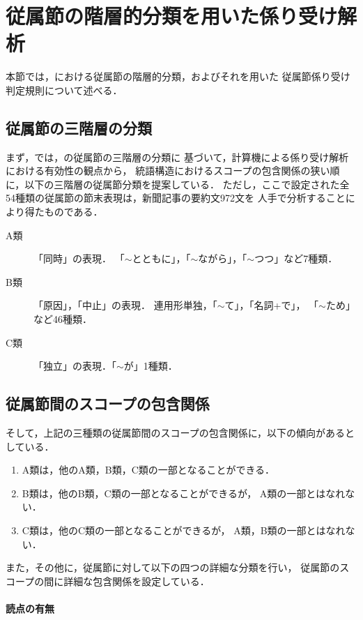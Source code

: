 \section{従属節の階層的分類を用いた係り受け解析}
\label{sec:sbrd_hd}

本節では，\cite{SShirai95bj}における従属節の階層的分類，およびそれを用いた
従属節係り受け判定規則について述べる．

\subsection{従属節の三階層の分類}
\label{subsec:clsb}

まず，\cite{SShirai95bj}では，\cite{Minami73aj,Minami93aj}の従属節の三階層の分類に
基づいて，計算機による係り受け解析における有効性の観点から，
統語構造におけるスコープの包含関係の狭い順に，以下の三階層の従属節分類を提案している．
ただし，ここで設定された全54種類の従属節の節末表現は，新聞記事の要約文972文を
人手で分析することにより得たものである．
\begin{description}
  \item[A類] 「同時」の表現．
        「$\sim$とともに」，「$\sim$ながら」，「$\sim$つつ」など7種類．
  \item[B類] 「原因」，「中止」の表現．
        連用形単独，「$\sim$て」，「名詞+で」，
        「$\sim$ため」など46種類．
  \item[C類] 「独立」の表現．「$\sim$が」1種類．
\end{description}

\subsection{従属節間のスコープの包含関係}

そして，上記の三種類の従属節間のスコープの包含関係に，以下の傾向があるとしている．
\begin{enumerate}
  \item A類は，他のA類，B類，C類の一部となることができる．
  \item B類は，他のB類，C類の一部となることができるが，
        A類の一部とはなれない．
  \item C類は，他のC類の一部となることができるが，
        A類，B類の一部とはなれない．
\end{enumerate}


また，その他に，従属節に対して以下の四つの詳細な分類を行い，
従属節のスコープの間に詳細な包含関係を設定している．


\paragraph{読点の有無}

